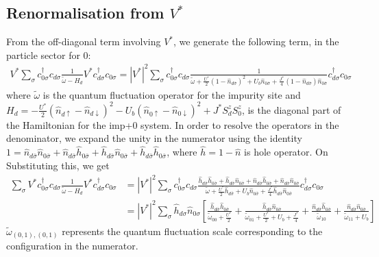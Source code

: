 \subsection{Renormalisation from \({V^*}\)}
From the off-diagonal term involving \({V^*}\), we generate the following term, in the particle sector for \(0\):
\begin{equation}\begin{aligned}
	{V^*} \sum_\sigma c^\dagger_{0\sigma}c_{d\sigma} \frac{1}{\tilde \omega - H_d} {V^*} c^\dagger_{d\sigma}c_{0\sigma} = |V^*|^2 \sum_\sigma c^\dagger_{0\sigma}c_{d\sigma} \frac{1}{\tilde \omega + \frac{U^*}{2}\left( 1 - \hat n_{d\bar\sigma} \right)^2 + U_b \hat n_{0\bar\sigma} + \frac{J^*}{4}\left( 1 - \hat n_{d\bar\sigma} \right) \hat n_{0\bar\sigma} } c^\dagger_{d\sigma}c_{0\sigma}
\end{aligned}\end{equation}
where \(\tilde \omega\) is the quantum fluctuation operator for the impurity site and \(H_d = -\frac{U^*}{2}\left( \hat n_{d \uparrow} - \hat n_{d \downarrow} \right)^2 - U_b \left( \hat n_{0 \uparrow} - \hat n_{0 \downarrow} \right)^2 + J^*S_d^z S_0^z \), is the diagonal part of the Hamiltonian for the imp+0 system. In order to resolve the operators in the denominator, we expand the unity in the numerator using the identity \(1 = \hat n_{d\bar\sigma}\hat n_{0\bar\sigma} + \hat n_{d\bar\sigma}\hat h_{0\bar\sigma} + \hat h_{d\bar\sigma}\hat n_{0\bar\sigma} + \hat h_{d\bar\sigma}\hat h_{0\bar\sigma}\), where \(\hat h = 1 - \hat n\) is hole operator. On Substituting this, we get
\begin{equation}\begin{aligned}
	\sum_\sigma {V^*} c^\dagger_{0\sigma}c_{d\sigma} \frac{1}{\tilde \omega - H_d} {V^*} c^\dagger_{d\sigma}c_{0\sigma} &= |V^*|^2 \sum_\sigma c^\dagger_{0\sigma}c_{d\sigma} \frac{\hat h_{d\bar\sigma}\hat h_{0\bar\sigma} + \hat h_{d\bar\sigma}\hat n_{0\bar\sigma} + \hat n_{d\bar\sigma}\hat h_{0\bar\sigma} + \hat n_{d\bar\sigma}\hat n_{0\bar\sigma}}{\tilde \omega + \frac{U^*}{2}\hat h_{d\bar\sigma} + U_b \hat n_{0\bar\sigma} + \frac{J^*}{4}\hat h_{d\bar\sigma} \hat n_{0\bar\sigma} } c^\dagger_{d\sigma}c_{0\sigma}\\
															    &= |V^*|^2 \sum_\sigma \hat h_{d\sigma} \hat n_{0\sigma}\left[\frac{\hat h_{d\bar\sigma}\hat h_{0\bar\sigma}}{\tilde\omega_{00} + \frac{U^*}{2}} + \frac{\hat h_{d\bar\sigma}\hat n_{0\bar\sigma}}{\tilde\omega_{01} + \frac{U^*}{2} + U_b + \frac{J^*}{4}} + \frac{\hat n_{d\bar\sigma}\hat h_{0\bar\sigma}}{\tilde\omega_{10}} + \frac{\hat n_{d\bar\sigma}\hat n_{0\bar\sigma}}{\tilde\omega_{11} + U_b}\right]
\end{aligned}\end{equation}
\(\tilde\omega_{(0,1),(0,1)}\) represents the quantum fluctuation scale corresponding to the configuration in the numerator.

